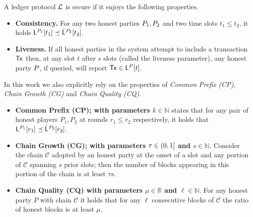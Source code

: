 \begin{definition}\label{de:ledger} A ledger protocol $\mathcal{L}$ is secure if it enjoys the following properties.



\begin{itemize}
  \item[]{\bf Consistency.}
    For any two honest parties $P_1,P_2$ and two time slots $t_1\leq t_2$,
    it holds  $\mathsf{L}^{P_1}[t_1] \preceq
    \check{\mathsf{L}}^{P_2}[t_2]$.

  \item[]{\bf Liveness.}
    If all honest parties in the system attempt to include a  transaction $\mathsf{Tx}$
    then, at any slot $t$ after $s$ slots (called the
    liveness parameter), any honest party $P$, if queried,
    will report $\mathsf{Tx} \in \mathsf{L}^{P}[t]$.
\end{itemize}

\end{definition}

In this work we also explicitly rely on the properties of \emph{Common Prefix (CP)}, \emph{Chain Growth (CG)} 
and  \emph{Chain Quality (CQ)}. 

\begin{itemize}
  \item[] {\bf Common Prefix (CP); with parameters $k\in\mathbb{N}$} 
states that for any pair of honest players  $P_1,P_2$ at rounds $r_1\leq r_2$ respectively, it holds that  ${ \mathsf{L}}^{P_1}[r_1] \preceq  {\check {\mathsf{L}}}^{P_2}[r_2] $.    
  \item[] {\bf Chain Growth (CG); with parameters $\tau\in (0,1]$ and $s\in\mathbb{N}$}. Consider the chain $\mathcal{C}$
  adopted by an honest party at the onset of a slot and any portion of $\mathcal{C}$ spanning $s$ prior slots; then the number of
  blocks appearing in this portion of the chain is at least $\tau s$.
  
  \item[] {\bf Chain Quality (CQ) with parameters $\mu\in\mathbb{R}$
and $\ell\in\mathbb{N}$}. For any honest party $P$ with chain $\mathcal{C}$  it holds that for any $\ell$ consecutive blocks of $\mathcal{C}$ the ratio of honest blocks is at least $\mu$.
 \end{itemize}



